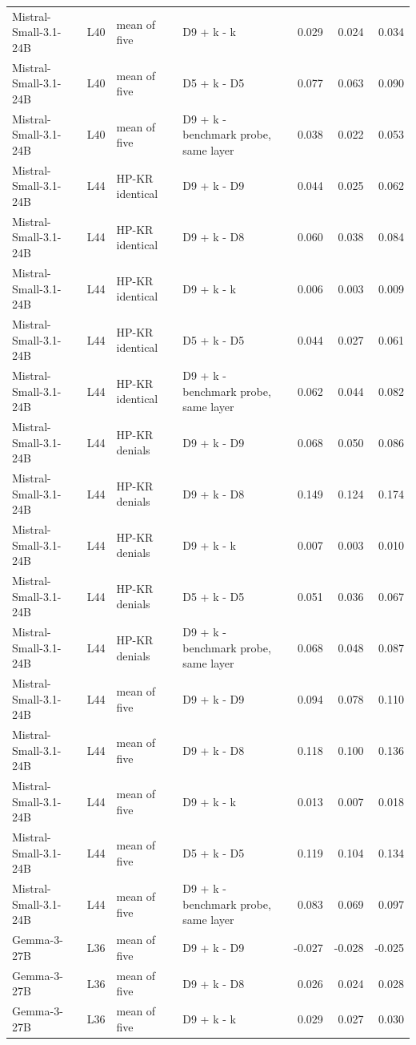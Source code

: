 \begin{table}
\begin{tabular}{llllrrr}
Mistral-Small-3.1-24B & L40 & mean of five & D9 + k - k & 0.029 & 0.024 & 0.034 \\
Mistral-Small-3.1-24B & L40 & mean of five & D5 + k - D5 & 0.077 & 0.063 & 0.090 \\
Mistral-Small-3.1-24B & L40 & mean of five & D9 + k - benchmark probe, same layer & 0.038 & 0.022 & 0.053 \\
Mistral-Small-3.1-24B & L44 & HP-KR identical & D9 + k - D9 & 0.044 & 0.025 & 0.062 \\
Mistral-Small-3.1-24B & L44 & HP-KR identical & D9 + k - D8 & 0.060 & 0.038 & 0.084 \\
Mistral-Small-3.1-24B & L44 & HP-KR identical & D9 + k - k & 0.006 & 0.003 & 0.009 \\
Mistral-Small-3.1-24B & L44 & HP-KR identical & D5 + k - D5 & 0.044 & 0.027 & 0.061 \\
Mistral-Small-3.1-24B & L44 & HP-KR identical & D9 + k - benchmark probe, same layer & 0.062 & 0.044 & 0.082 \\
Mistral-Small-3.1-24B & L44 & HP-KR denials & D9 + k - D9 & 0.068 & 0.050 & 0.086 \\
Mistral-Small-3.1-24B & L44 & HP-KR denials & D9 + k - D8 & 0.149 & 0.124 & 0.174 \\
Mistral-Small-3.1-24B & L44 & HP-KR denials & D9 + k - k & 0.007 & 0.003 & 0.010 \\
Mistral-Small-3.1-24B & L44 & HP-KR denials & D5 + k - D5 & 0.051 & 0.036 & 0.067 \\
Mistral-Small-3.1-24B & L44 & HP-KR denials & D9 + k - benchmark probe, same layer & 0.068 & 0.048 & 0.087 \\
Mistral-Small-3.1-24B & L44 & mean of five & D9 + k - D9 & 0.094 & 0.078 & 0.110 \\
Mistral-Small-3.1-24B & L44 & mean of five & D9 + k - D8 & 0.118 & 0.100 & 0.136 \\
Mistral-Small-3.1-24B & L44 & mean of five & D9 + k - k & 0.013 & 0.007 & 0.018 \\
Mistral-Small-3.1-24B & L44 & mean of five & D5 + k - D5 & 0.119 & 0.104 & 0.134 \\
Mistral-Small-3.1-24B & L44 & mean of five & D9 + k - benchmark probe, same layer & 0.083 & 0.069 & 0.097 \\
Gemma-3-27B & L36 & mean of five & D9 + k - D9 & -0.027 & -0.028 & -0.025 \\
Gemma-3-27B & L36 & mean of five & D9 + k - D8 & 0.026 & 0.024 & 0.028 \\
Gemma-3-27B & L36 & mean of five & D9 + k - k & 0.029 & 0.027 & 0.030 \\

\end{tabular}
\end{table}
